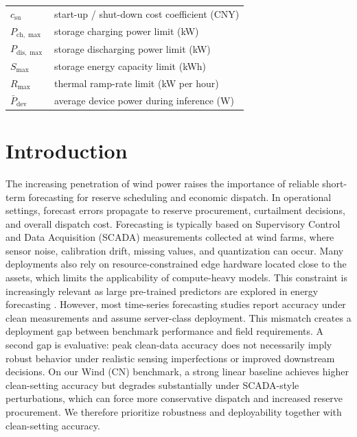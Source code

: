\documentclass[review,3p,times]{elsarticle}
\begin{document}
\begin{center}
{\begin{minipage}{0.97\textwidth}
\begin{tabular}{@{}p{}p{}@{}}
$c_{\text{su}}$ & start-up / shut-down cost coefficient (CNY) \\
$P_{\text{ch},\max}$ & storage charging power limit (kW) \\
$P_{\text{dis},\max}$ & storage discharging power limit (kW) \\
$S_{\max}$ & storage energy capacity limit (kWh) \\
$R_{\max}$ & thermal ramp-rate limit (kW per hour) \\
$\bar{P}_{\text{dev}}$ & average device power during inference (W) \\
\bottomrule
\end{tabular}
\end{minipage}}
\end{center}

\section{Introduction}
\label{sec:intro}

The increasing penetration of wind power raises the importance of reliable short-term forecasting for reserve scheduling and economic dispatch. In operational settings, forecast errors propagate to reserve procurement, curtailment decisions, and overall dispatch cost. Forecasting is typically based on Supervisory Control and Data Acquisition (SCADA) measurements collected at wind farms, where sensor noise, calibration drift, missing values, and quantization can occur. Many deployments also rely on resource-constrained edge hardware located close to the assets, which limits the applicability of compute-heavy models. This constraint is increasingly relevant as large pre-trained predictors are explored in energy forecasting \cite{gao2025mmgpt,wu2024stellm}. However, most time-series forecasting studies report accuracy under clean measurements and assume server-class deployment. This mismatch creates a deployment gap between benchmark performance and field requirements. A second gap is evaluative: peak clean-data accuracy does not necessarily imply robust behavior under realistic sensing imperfections or improved downstream decisions. On our Wind (CN) benchmark, a strong linear baseline achieves higher clean-setting accuracy but degrades substantially under SCADA-style perturbations, which can force more conservative dispatch and increased reserve procurement. We therefore prioritize robustness and deployability together with clean-setting accuracy.
\end{document}
